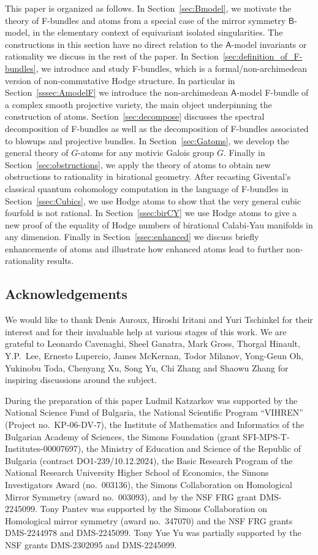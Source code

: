 \documentclass[twoside,leqno]{article}
\numberwithin{equation}{section}
\theoremstyle{plain}
\theoremstyle{definition}
\begin{document}
This paper is organized as follows.
In Section~\ref{sec:Bmodel}, we motivate the theory of F-bundles and atoms from a special case of the mirror symmetry $\mathsf{B}$-model, in the  elementary context of  equivariant isolated singularities.
The constructions in this section have no direct relation to the $\mathsf{A}$-model invariants or rationality we discuss in the rest of the paper.
In Section~\ref{sec:definition_of_F-bundles}, we introduce and study F-bundles, which is a formal/non-archimedean version of non-commutative Hodge structure.
In particular in Section~\ref{sssec:AmodelF} we introduce the non-archimedean $\mathsf{A}$-model F-bundle of a complex smooth projective variety, the main object underpinning the construction of atoms. Section~\ref{sec:decompose} discusses the spectral decomposition of F-bundles as well as the decomposition of F-bundles associated to blowups and projective bundles.
In Section~\ref{sec:Gatoms}, we develop the general theory of $G$-atoms for any motivic Galois group $G$.
Finally in Section~\ref{sec:obstructions}, we apply the theory of atoms to obtain new obstructions to rationality in birational geometry.
After recasting Givental's classical quantum cohomology computation in the language of F-bundles in Section~\ref{ssec:Cubics},  we use Hodge atoms to show that the very general cubic fourfold is not rational.
In Section~\ref{ssec:birCY} we use Hodge atoms to give a new proof of the equality of Hodge numbers of birational Calabi-Yau manifolds in any dimension.
Finally in Section~\ref{ssec:enhanced} we discuss briefly enhancements of atoms and illustrate how enhanced atoms lead to further non-rationality results.

\subsection*{Acknowledgements}

We would like to thank Denis Auroux, Hiroshi Iritani and Yuri Tschinkel for their interest and for their invaluable help at various stages of this work.
We are grateful to Leonardo Cavenaghi, Sheel Ganatra, Mark Gross, Thorgal Hinault, Y.P.\ Lee, Ernesto Lupercio, James McKernan, Todor Milanov, Yong-Geun Oh, Yukinobu Toda, Chenyang Xu, Song Yu, Chi Zhang and Shaowu Zhang for inspiring discussions around the subject. 

During the preparation of this paper Ludmil Katzarkov was supported by the National Science Fund of Bulgaria, the National Scientific Program ``VIHREN'' (Project no.\ KP-06-DV-7), the Institute of Mathematics and Informatics of the Bulgarian Academy of Sciences, the Simons Foundation (grant SFI-MPS-T-Institutes-00007697), the Ministry of Education and Science of the Republic of Bulgaria (contract DO1-239/10.12.2024), the Basic Research Program of the National Research University Higher School of Economics, the Simons Investigators Award (no.\ 003136), the Simons Collaboration on Homological Mirror Symmetry (award no.\ 003093), and by the NSF FRG grant DMS-2245099. Tony Pantev was supported by the Simons Collaboration on Homological mirror symmetry (award no.\ 347070) and the NSF FRG grants DMS-2244978 and DMS-2245099.
Tony Yue Yu was partially supported by the NSF grants DMS-2302095 and DMS-2245099.
\end{document}
